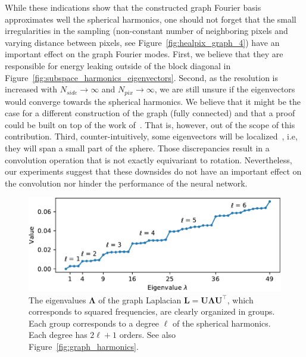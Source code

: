 \documentclass[final,twocolumn,3p,times,sort&compress]{elsarticle}
\newcommand{\figref}[1]{Figure~\ref{fig:#1}}
\renewcommand{\b}[1]{{\bm{#1}}}   %
\newcommand{\1}{\b{1}}              %
\newcommand{\0}{\b{0}}              %
\renewcommand{\L}{\b{L}}
\newcommand{\U}{\b{U}}
\newcommand{\trans}{^\intercal}
\newcommand{\bLambda}{\b{\Lambda}}
\begin{document}
While these indications show that the constructed graph Fourier basis approximates well the spherical harmonics, one should not forget that the small irregularities in the sampling (non-constant number of neighboring pixels and varying distance between pixels, see \figref{healpix_graph_4}) have an important effect on the graph Fourier modes.
First, we believe that they are responsible for energy leaking outside of the block diagonal in \figref{subspace_harmonics_eigenvectors}.
Second, as the resolution is increased with $N_{side} \rightarrow \infty$ and $N_{pix} \rightarrow \infty$, we are still unsure if the eigenvectors would converge towards the spherical harmonics. We believe that it might be the case for a different construction of the graph (fully connected) and that a proof could be built on top of the work of~\cite{belkin2007convergence}. That is, however, out of the scope of this contribution.
Third, counter-intuitively, some eigenvectors will be localized~\citep{perraudin2018global}, i.e, they will span a small part of the sphere.
Those discrepancies result in a convolution operation that is not exactly equivariant to rotation.
Nevertheless, our experiments suggest that these downsides do not have an important effect on the convolution nor hinder the performance of the neural network.

\begin{figure}
	\centering
	\includegraphics[width=\linewidth]{graph_eigenvalues}
	\caption{The eigenvalues $\bLambda$ of the graph Laplacian $\L = \U \bLambda \U\trans$, which corresponds to squared frequencies, are clearly organized in groups. Each group corresponds to a degree $\ell$ of the spherical harmonics. Each degree has $2\ell + 1$ orders. See also \figref{graph_harmonics}.}
	\label{fig:graph_eigenvalues}
\end{figure}
\end{document}
